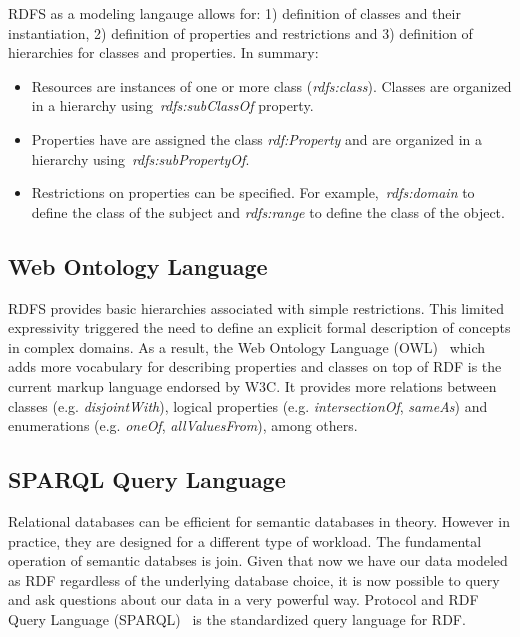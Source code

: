 RDFS as a modeling langauge allows for: 1) definition of classes and their instantiation, 2) definition of properties and restrictions and 3) definition of hierarchies for classes and properties. In summary:

\begin{itemize}
	\item Resources are instances of one or more class (\emph{rdfs:class}). Classes are organized in a hierarchy using~\emph{rdfs:subClassOf} property.
	\item Properties have are assigned the class \emph{rdf:Property} and are organized in a hierarchy using~\emph{rdfs:subPropertyOf}.
	\item Restrictions on properties can be specified. For example,~\emph{rdfs:domain} to define the class of the subject and \emph{rdfs:range} to define the class of the object.
\end{itemize}

\subsection{Web Ontology Language}

RDFS provides basic hierarchies associated with simple restrictions. This limited expressivity triggered the need to define an explicit formal description of concepts in complex domains. As a result, the Web Ontology Language (OWL)~\cite{W3C:OWL:12} which adds more vocabulary for describing properties and classes on top of RDF is the current markup language endorsed by W3C. It provides more relations between classes (e.g. \emph{disjointWith}), logical properties (e.g. \emph{intersectionOf}, \emph{sameAs}) and enumerations (e.g. \emph{oneOf}, \emph{allValuesFrom}), among others.

\subsection{SPARQL Query Language}

Relational databases can be efficient for semantic databases in theory. However in practice, they are designed for a different type of workload. The fundamental operation of semantic databses is join. Given that now we have our data modeled as RDF regardless of the underlying database choice, it is now possible to query and ask questions about our data in a very powerful way. Protocol and RDF Query Language (SPARQL)~\cite{Prud:SPARQL:08} is the standardized query language for RDF.

